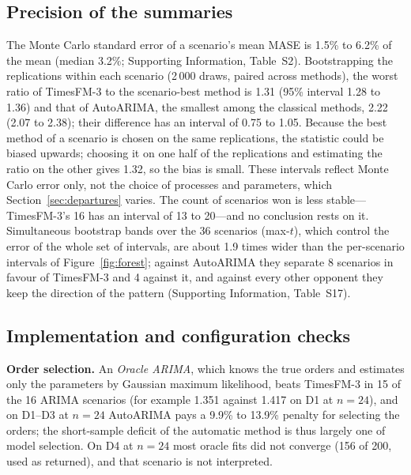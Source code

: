 \documentclass[ASNA]{USG}
\providecommand{\sectionref}[1]{Section~\ref{#1}}
\providecommand{\figureref}[1]{Figure~\ref{#1}}
\begin{document}
\subsection{Precision of the summaries}
\label{sec:mcse}

The Monte Carlo standard error of a scenario's mean MASE is 1.5\% to 6.2\% of the mean (median 3.2\%;
Supporting Information, Table~S2). Bootstrapping the replications within each scenario (2\,000 draws, paired
across methods), the worst ratio of TimesFM-3 to the scenario-best method is 1.31 (95\% interval 1.28 to 1.36)
and that of AutoARIMA, the smallest among the classical methods, 2.22 (2.07 to 2.38); their difference has
an interval of 0.75 to 1.05. Because the best method of a scenario is chosen on the same replications, the
statistic could be biased upwards; choosing it on one half of the replications and estimating the ratio on
the other gives 1.32, so the bias is small. These intervals reflect Monte Carlo error only, not the choice
of processes and parameters, which \sectionref{sec:departures} varies. The count of scenarios won is less
stable---TimesFM-3's 16 has an interval of 13 to 20---and no conclusion rests on it. Simultaneous
bootstrap bands over the 36 scenarios (max-$t$), which control the error of the whole set of intervals, are
about 1.9 times wider than the per-scenario intervals of \figureref{fig:forest}; against AutoARIMA they
separate 8 scenarios in favour of TimesFM-3 and 4 against it, and against every other opponent they keep
the direction of the pattern (Supporting Information, Table~S17).

\subsection{Implementation and configuration checks}
\label{sec:checks}

\textbf{Order selection.} An \emph{Oracle ARIMA}, which knows the true orders and estimates only the
parameters by Gaussian maximum likelihood, beats TimesFM-3 in 15 of the 16 ARIMA scenarios (for example 1.351
against 1.417 on D1 at $n = 24$), and on D1--D3 at $n = 24$ AutoARIMA pays a 9.9\% to 13.9\% penalty for
selecting the orders; the short-sample deficit of the automatic method is thus largely one of model
selection. On D4 at $n = 24$ most oracle fits did not converge (156 of 200, used as returned), and that scenario
is not interpreted.
\end{document}
